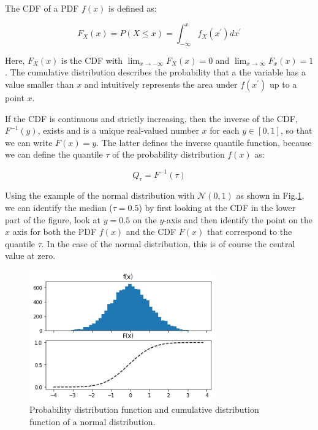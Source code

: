\documentclass[BCOR=1mm, DIV=calc,10pt,
twoside=true,
twocolumn,
headings=normal]{scrartcl}
\newcommand{\fig}{Fig.}
\begin{document}
The CDF of a PDF $f(x)$ is defined as:

\begin{equation}
\label{eqn:CDF}
F_X(x) = P(X \le x) = \int_{-\infty}^{x} f_X(x^\prime) dx^\prime
\end{equation}

Here, $F_X(x)$ is the CDF with $\lim_{x \to -\infty}F_X(x) = 0$ and $\lim_{x \to \infty}F_x(x) = 1$. The cumulative distribution describes the probability that a the variable has a value smaller than $x$ and intuitively represents the area under $f(x^\prime)$ up to a point $x$.

If the CDF is continuous and strictly increasing, then the inverse of the CDF, $F^{-1}(y)$, exists and is a unique real-valued number $x$ for each $y \in [0,1]$, so that we can write $F(x) = y$. The latter defines the inverse quantile function, because we can define the quantile $\tau$ of the probability distribution $f(x)$ as:

\begin{equation}
Q_\tau = F^{-1}(\tau)
\end{equation}

Using the example of the normal distribution with $\mathcal{N}(0,1)$ as shown in \fig \ref{fig:PdfCdf}, we can identify the median ($\tau = 0.5$) by first looking at the CDF in the lower part of the figure, look at $y=0.5$ on the $y$-axis and then identify the point on the $x$ axis for both the PDF $f(x)$ and the CDF $F(x)$ that correspond to the quantile $\tau$. In the case of the normal distribution, this is of course the central value at zero.

\begin{figure}
\begin{center}
\includegraphics[width=8cm]{../figures/PdfCdf}
\caption{\label{fig:PdfCdf} Probability distribution function and cumulative distribution function of a normal distribution.}
\end{center}
\end{figure}
\end{document}
